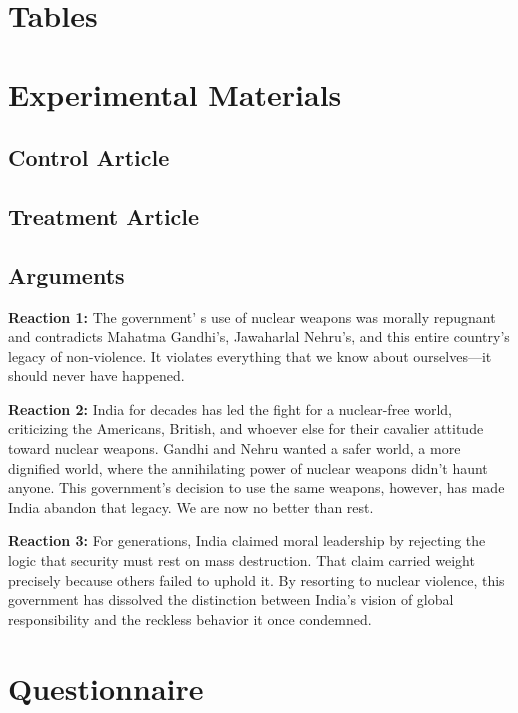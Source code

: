 \documentclass[12pt]{article}
\begin{document}


\appendix

\section{Tables}

\section{Experimental Materials}
\label{app:vignettes}
\subsection*{Control Article}

\subsection*{Treatment Article}

\subsection*{Arguments}

\textbf{Reaction 1:} The government’ s use of nuclear weapons was morally repugnant and contradicts Mahatma Gandhi’s, Jawaharlal Nehru’s, and this entire country's legacy of non-violence. It violates everything that we know about ourselves—it should never have happened.

\textbf{Reaction 2:} India for decades has led the fight for a nuclear-free world, criticizing the Americans, British, and whoever else for their cavalier attitude toward nuclear weapons. Gandhi and Nehru wanted a safer world, a more dignified world, where the annihilating power of nuclear weapons didn’t haunt anyone. This government’s decision to use the same weapons, however, has made India abandon that legacy. We are now no better than rest.

\textbf{Reaction 3:} For generations, India claimed moral leadership by rejecting the logic that security must rest on mass destruction. That claim carried weight precisely because others failed to uphold it. By resorting to nuclear violence, this government has dissolved the distinction between India’s vision of global responsibility and the reckless behavior it once condemned.

\section{Questionnaire}
\end{document}
